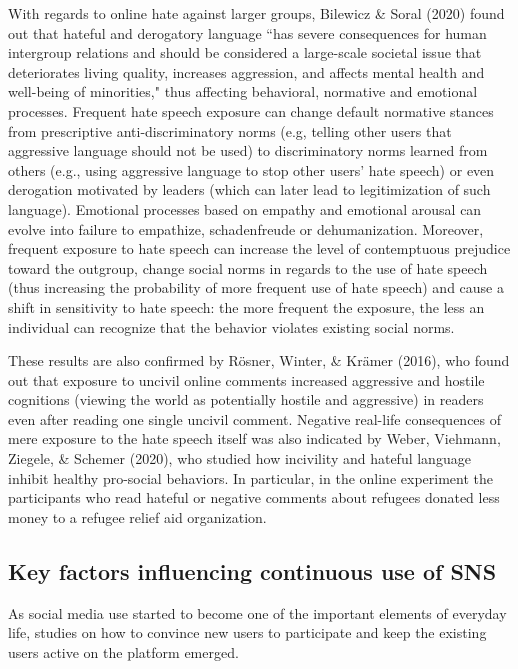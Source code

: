 \documentclass[10pt,dvipsnames]{scrartcl}
\begin{document}
With regards to online hate against larger groups, Bilewicz \& Soral
(2020) found out that hateful and derogatory language ``has severe
consequences for human intergroup relations and should be considered a
large-scale societal issue that deteriorates living quality, increases
aggression, and affects mental health and well-being of minorities,"
thus affecting behavioral, normative and emotional processes. Frequent
hate speech exposure can change default normative stances from
prescriptive anti-discriminatory norms (e.g, telling other users that
aggressive language should not be used) to discriminatory norms learned
from others (e.g., using aggressive language to stop other users' hate
speech) or even derogation motivated by leaders (which can later lead to
legitimization of such language). Emotional processes based on empathy
and emotional arousal can evolve into failure to empathize,
schadenfreude or dehumanization. Moreover, frequent exposure to hate
speech can increase the level of contemptuous prejudice toward the
outgroup, change social norms in regards to the use of hate speech (thus
increasing the probability of more frequent use of hate speech) and
cause a shift in sensitivity to hate speech: the more frequent the
exposure, the less an individual can recognize that the behavior
violates existing social norms.

These results are also confirmed by Rösner, Winter, \& Krämer (2016),
who found out that exposure to uncivil online comments increased
aggressive and hostile cognitions (viewing the world as potentially
hostile and aggressive) in readers even after reading one single uncivil
comment. Negative real-life consequences of mere exposure to the hate
speech itself was also indicated by Weber, Viehmann, Ziegele, \& Schemer
(2020), who studied how incivility and hateful language inhibit healthy
pro-social behaviors. In particular, in the online experiment the
participants who read hateful or negative comments about refugees
donated less money to a refugee relief aid organization.

\subsection{Key factors  influencing continuous use of SNS}

As social media use started to become one of the important elements of
everyday life, studies on how to convince new users to participate and
keep the existing users active on the platform emerged.
\end{document}
